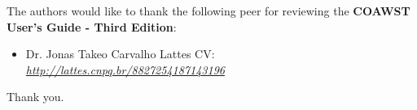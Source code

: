  The authors would like to thank the following peer for reviewing the \textbf{COAWST User's Guide - Third Edition}:
\bigskip

\begin{itemize}
    \item Dr. Jonas Takeo Carvalho \newline Lattes CV: \textit{\textcolor{bleu_cite}{\href{http://lattes.cnpq.br/8827254187143196}{http://lattes.cnpq.br/8827254187143196}}}
\end{itemize}

\bigskip
    Thank you. \\
